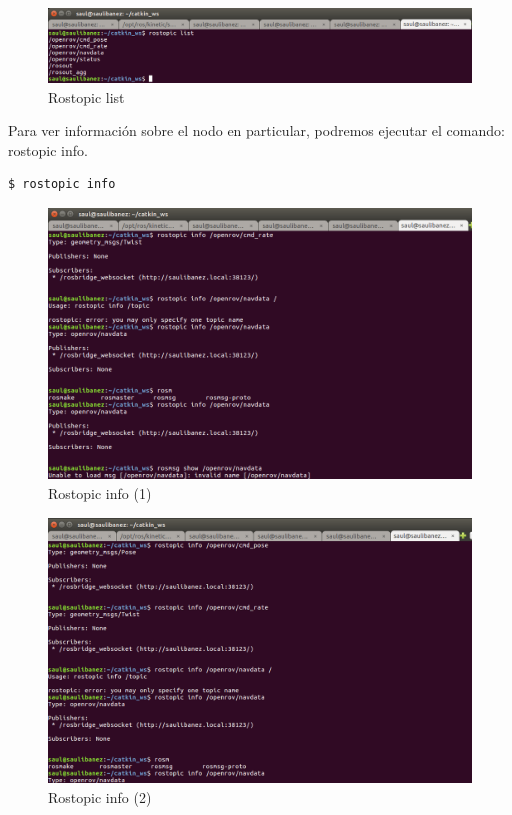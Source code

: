 \begin{figure} [hbtp]
  \begin{center}
    \includegraphics[width=14cm]{img/cap4/rostopic_list}
  \end{center}
  \caption{Rostopic list}
  \label{fig:rostopic_list}
\end{figure}

Para ver información sobre el nodo en particular, podremos ejecutar el comando: rostopic info.
\begin{lstlisting}[caption=rostopic info, label={lst:info}]
	$ rostopic info
\end{lstlisting}

\begin{figure} [hbtp]
  \begin{center}
    \includegraphics[width=12cm]{img/cap4/info1}
  \end{center}
  \caption{Rostopic info (1)}
  \label{fig:rostopic_info}
\end{figure}
\begin{figure} [hbtp]
  \begin{center}
    \includegraphics[width=12cm]{img/cap4/info2}
  \end{center}
  \caption{Rostopic info (2)}
  \label{fig:rostopic_info}
\end{figure}